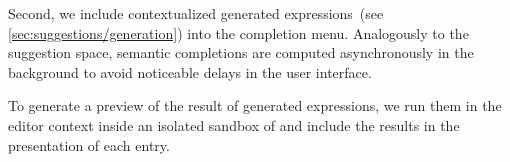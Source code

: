 Second, we include contextualized generated expressions~(see \cref{sec:suggestions/generation}) into the completion menu.
Analogously to the suggestion space, semantic completions are computed asynchronously in the background to avoid noticeable delays in the user interface.

To generate a preview of the result of generated expressions, we run them in the editor context inside an isolated sandbox of \simstudio and include the results in the presentation of each entry.
